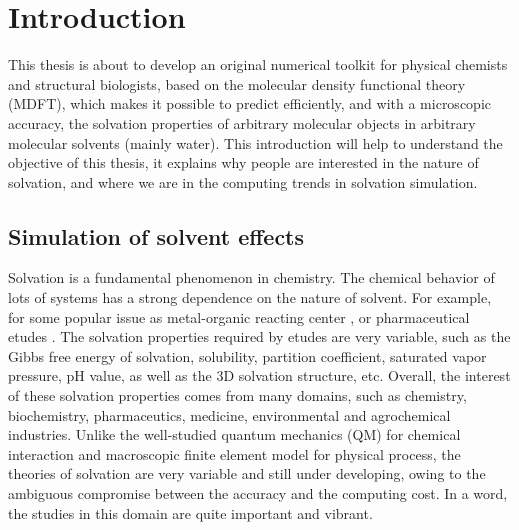 
\chapter{Introduction\label{chpt:introduction}}

This thesis is about to develop an original numerical toolkit for
physical chemists and structural biologists, based on the molecular
density functional theory (\acs{MDFT}), which makes it possible to
predict efficiently, and with a microscopic accuracy, the solvation
properties of arbitrary molecular objects in arbitrary molecular solvents
(mainly water). This introduction will help to understand the objective
of this thesis, it explains why people are interested in the nature
of solvation, and where we are in the computing trends in solvation
simulation.


\section{Simulation of solvent effects}

Solvation is a fundamental phenomenon in chemistry. The chemical behavior
of lots of systems has a strong dependence on the nature of solvent.
For example, for some popular issue as metal-organic reacting center
\citep{Mn-oxo,PCET}, or pharmaceutical etudes \citep{drug_1_Perlovich,drug_2_Perlovich,drug_3}.
The solvation properties required by etudes are very variable, such
as the Gibbs free energy of solvation, solubility, partition coefficient,
saturated vapor pressure, pH value, as well as the 3D solvation structure,
etc. Overall, the interest of these solvation properties comes from
many domains, such as chemistry, biochemistry, pharmaceutics, medicine,
environmental and agrochemical industries. Unlike the well-studied
quantum mechanics (\acs{QM}) for chemical interaction and macroscopic
finite element model for physical process, the theories of solvation
are very variable and still under developing, owing to the ambiguous
compromise between the accuracy and the computing cost. In a word,
the studies in this domain are quite important and vibrant.


